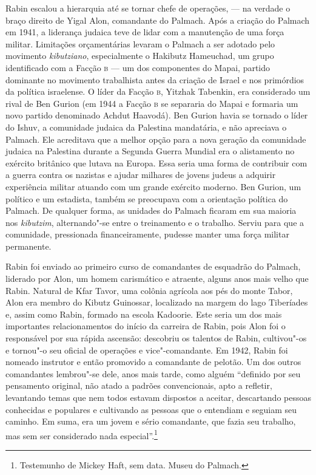 Rabin escalou a hierarquia até se tornar chefe de operações, --- na
verdade o braço direito de Yigal Alon, comandante do Palmach. Após a
criação do Palmach em 1941, a liderança judaica teve de lidar com a
manutenção de uma força militar. Limitações orçamentárias
levaram o Palmach a ser adotado pelo movimento \textit{kibutziano}, especialmente
o Hakibutz Hameuchad, um grupo identificado com a Facção \textsc{b} --- um dos
componentes do Mapai, partido dominante no movimento trabalhista
antes da criação de Israel e nos primórdios da política israelense. O
líder da Facção \textsc{b}, Yitzhak Tabenkin, era considerado um rival de Ben
Gurion (em 1944 a Facção \textsc{b} se separaria do Mapai e formaria um novo
partido denominado Achdut Haavodá). Ben Gurion havia se
tornado o líder do Ishuv, a comunidade judaica da Palestina mandatária, e
não apreciava o Palmach. Ele acreditava que a melhor opção
para a nova geração da comunidade judaica na Palestina durante a Segunda
Guerra Mundial era o alistamento no exército britânico que lutava na
Europa. Essa seria uma forma de contribuir com a guerra contra os
nazistas e ajudar milhares de jovens judeus a adquirir experiência
militar atuando com um grande exército moderno. Ben Gurion, um político
e um estadista, também se preocupava com a orientação política
do Palmach. De qualquer forma, as unidades do Palmach ficaram em sua
maioria nos \textit{kibutzim}, alternando"-se entre o treinamento e o trabalho.
Serviu para que a comunidade, pressionada financeiramente, pudesse
manter uma força militar permanente.

Rabin foi enviado ao primeiro curso de comandantes de esquadrão do
Palmach, liderado por Alon, um homem carismático e atraente, alguns anos
mais velho que Rabin. Natural de Kfar Tavor, uma colônia agrícola aos
pés do monte Tabor, Alon era membro do Kibutz Guinossar, localizado na
margem do lago Tiberíades e, assim como Rabin, formado na escola
Kadoorie. Este seria um dos mais importantes relacionamentos do início
da carreira de Rabin, pois Alon foi o responsável por sua rápida
ascensão: descobriu os talentos de Rabin, cultivou"-os e tornou"-o seu
oficial de operações e vice"-comandante. Em 1942, Rabin foi nomeado
instrutor e então promovido a comandante de pelotão. Um dos outros
comandantes lembrou"-se dele, anos mais tarde, como alguém
``definido por seu pensamento original, não atado a padrões
convencionais, apto a refletir, levantando temas que nem todos estavam
dispostos a aceitar, descartando pessoas conhecidas e populares e
cultivando as pessoas que o entendiam e seguiam seu caminho. Em suma,
era um jovem e sério comandante, que fazia seu trabalho, mas sem ser
considerado nada especial''.\footnote{Testemunho de Mickey Haft, sem data. Museu do Palmach.}

